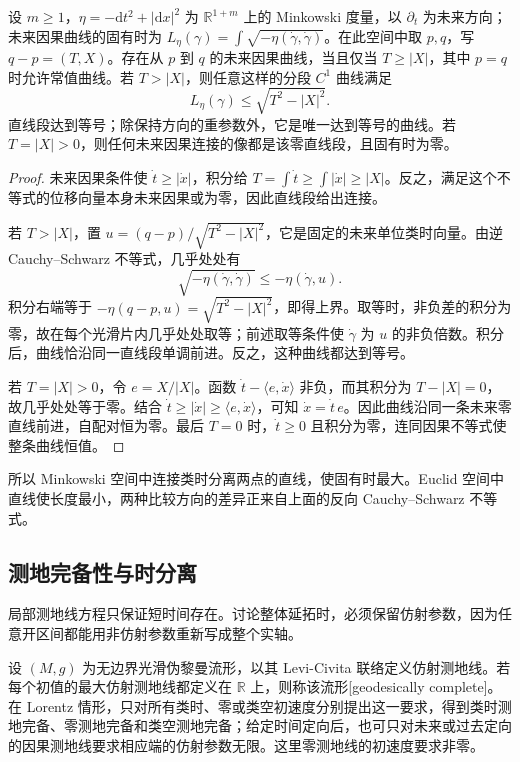 \begin{proposition}\label{g3:prop:A-minkowski-proper-time}
	设 \(m\ge1\)，\(\eta=-\mathrm dt^2+|\mathrm dx|^2\) 为 \(\mathbb R^{1+m}\) 上的 Minkowski 度量，以 \(\partial_t\) 为未来方向；未来因果曲线的固有时为 \(L_\eta(\gamma)=\int\sqrt{-\eta(\dot\gamma,\dot\gamma)}\)。在此空间中取 \(p,q\)，写 \(q-p=(T,X)\)。存在从 \(p\) 到 \(q\) 的未来因果曲线，当且仅当 \(T\ge|X|\)，其中 \(p=q\) 时允许常值曲线。若 \(T>|X|\)，则任意这样的分段 \(C^1\) 曲线满足
	\[
		L_\eta(\gamma)\le\sqrt{T^2-|X|^2}.
	\]
	直线段达到等号；除保持方向的重参数外，它是唯一达到等号的曲线。若 \(T=|X|>0\)，则任何未来因果连接的像都是该零直线段，且固有时为零。
\end{proposition}
\begin{proof}
	未来因果条件使 \(\dot t\ge|\dot x|\)，积分给
	\(T=\int\dot t\ge\int|\dot x|\ge|X|\)。反之，满足这个不等式的位移向量本身未来因果或为零，因此直线段给出连接。

	若 \(T>|X|\)，置 \(u=(q-p)/\sqrt{T^2-|X|^2}\)，它是固定的未来单位类时向量。由逆 Cauchy--Schwarz 不等式，几乎处处有
	\[
		\sqrt{-\eta(\dot\gamma,\dot\gamma)}
		\le-\eta(\dot\gamma,u).
	\]
	积分右端等于 \(-\eta(q-p,u)=\sqrt{T^2-|X|^2}\)，即得上界。取等时，非负差的积分为零，故在每个光滑片内几乎处处取等；前述取等条件使 \(\dot\gamma\) 为 \(u\) 的非负倍数。积分后，曲线恰沿同一直线段单调前进。反之，这种曲线都达到等号。

	若 \(T=|X|>0\)，令 \(e=X/|X|\)。函数
	\(\dot t-\langle e,\dot x\rangle\) 非负，而其积分为
	\(T-|X|=0\)，故几乎处处等于零。结合
	\(\dot t\ge|\dot x|\ge\langle e,\dot x\rangle\)，可知
	\(\dot x=\dot t\,e\)。因此曲线沿同一条未来零直线前进，自配对恒为零。最后 \(T=0\) 时，\(\dot t\ge0\) 且积分为零，连同因果不等式使整条曲线恒值。
\end{proof}

所以 Minkowski 空间中连接类时分离两点的直线，使固有时最大。Euclid 空间中直线使长度最小，两种比较方向的差异正来自上面的反向 Cauchy--Schwarz 不等式。

\subsection{测地完备性与时分离}
\label{g3:subsec:A01:04}

局部测地线方程只保证短时间存在。讨论整体延拓时，必须保留仿射参数，因为任意开区间都能用非仿射参数重新写成整个实轴。

\begin{definition}\label{g3:def:A-affine-completeness}
	设 \((M,g)\) 为无边界光滑伪黎曼流形，以其 Levi-Civita 联络定义仿射测地线。若每个初值的最大仿射测地线都定义在 \(\mathbb R\) 上，则称该流形[geodesically complete]。在 Lorentz 情形，只对所有类时、零或类空初速度分别提出这一要求，得到类时测地完备、零测地完备和类空测地完备；给定时间定向后，也可只对未来或过去定向的因果测地线要求相应端的仿射参数无限。这里零测地线的初速度要求非零。
\end{definition}

